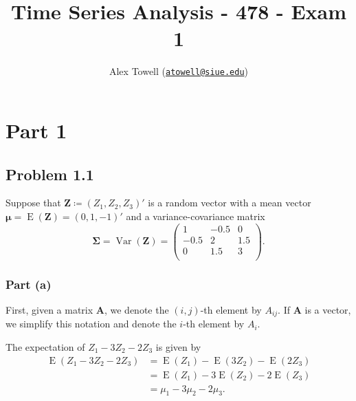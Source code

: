 \documentclass[
]{article}
\title{Time Series Analysis - 478 - Exam 1}
\author{Alex Towell
(\href{mailto:atowell@siue.edu}{\nolinkurl{atowell@siue.edu}})}
\date{}
\begin{document}
\maketitle

\newcommand{\var}{\operatorname{Var}}
\newcommand{\expect}{\operatorname{E}}
\newcommand{\corr}{\operatorname{Corr}}
\newcommand{\cov}{\operatorname{Cov}}
\newcommand{\ssr}{\operatorname{SSR}}
\newcommand{\se}{\operatorname{SE}}

\newcommand{\mat}[1]{\bm{#1}}
\newcommand{\eval}[2]{\left. #1 \right\vert_{#2}}

\hypertarget{part-1}{%
\section{Part 1}\label{part-1}}

\hypertarget{problem-1.1}{%
\subsection{Problem 1.1}\label{problem-1.1}}

Suppose that \(\bm{Z} \coloneqq (Z_1,Z_2,Z_3)'\) is a random vector with
a mean vector \(\bm{\mu} = \operatorname{E}(\bm{Z}) = (0,1,-1)'\) and a
variance-covariance matrix \[
   \bm{\Sigma} = \operatorname{Var}(\bm{Z}) =
   \begin{pmatrix}
       1    & -0.5 & 0   \\
       -0.5 & 2    & 1.5 \\
       0    & 1.5  & 3   \\
   \end{pmatrix}.
\]

\hypertarget{part-a}{%
\subsubsection{Part (a)}\label{part-a}}


First, given a matrix \(\bm{A}\), we denote the \((i,j)\)-th element by
\(A_{i j}\). If \(\bm{A}\) is a vector, we simplify this notation and
denote the \(i\)-th element by \(A_i\).

The expectation of \(Z_1 - 3 Z_2 - 2 Z_3\) is given by \begin{align*}
      \operatorname{E}(Z_1 - 3 Z_2 - 2 Z_3) &= \operatorname{E}(Z_1) - \operatorname{E}(3 Z_2) - \operatorname{E}(2 Z_3)\\
      &= \operatorname{E}(Z_1) - 3 \operatorname{E}(Z_2) - 2 \operatorname{E}(Z_3)\\
      &= \mu_1 - 3 \mu_2 - 2 \mu_3.
\end{align*}
\end{document}
